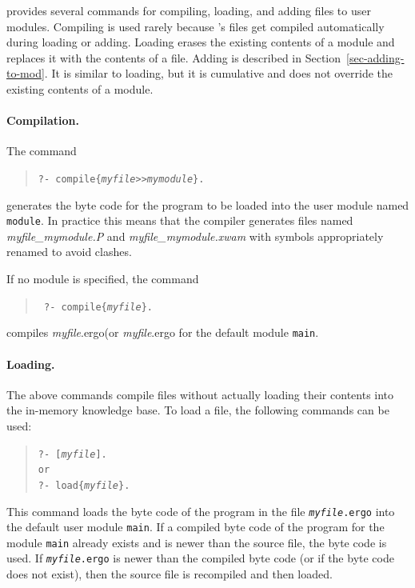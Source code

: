 \documentclass[11pt]{article}
\newcommand{\ERGO}{\mbox{\smaller{\ensuremath{\cal{E}}\smaller{{\sc{RGO}}}}}\xspace}
\newcommand{\FLSYSTEM}{\ERGO}
\newcommand{\ergoext}{ergo\xspace}
\newcommand{\ofile}{xwam}
\begin{document}
\FLSYSTEM provides several commands for compiling, loading, and adding
files to user modules. 
Compiling is used rarely because \FLSYSTEM's files get compiled
automatically during loading or adding.
Loading erases the existing contents of a module and replaces it with the
contents of a file.
Adding is described in Section~\ref{sec-adding-to-mod}.
It is similar to loading, but it is cumulative and does not
override the existing contents of a module. 

\paragraph{Compilation.}
The command 
\begin{quote}
  {\tt ?- compile\{{\it myfile}>{}>{\it mymodule}\}.}
\end{quote}
generates the byte code for the program to be loaded into the user module
named {\tt module}. In
practice this means that the compiler generates files named
\emph{myfile\_mymodule.P} and \emph{myfile\_mymodule.\ofile} with symbols appropriately
renamed to avoid clashes.

If no module is specified, the command
\begin{quote}
 \tt
 ?- compile\{{\it myfile}\}.
\end{quote}
compiles {\it myfile}.\ergoext (or \textit{myfile}.\ergoext for the default module {\tt main}.


\paragraph{Loading.}
%
The above commands compile files without actually loading their contents
into the in-memory knowledge base. 
To load a file, the following commands can be used:
\index{\tt [file]}
\begin{quote}
 \tt ?- [\textit{myfile}].  
 \\
 or
 \\
 \tt ?- load\{\textit{myfile}\}.
\end{quote}
This command loads the byte code of the program in the file {\tt \textit{myfile}.\ergoext} into the default user
module {\tt main}. If a compiled byte code of the program for the module
{\tt main} already exists and is newer than the source file, the byte code
is used.  If {\tt \textit{myfile}.\ergoext} is newer than the compiled byte code (or if
the byte code does not exist), then
the source file is recompiled and then loaded.
\end{document}
